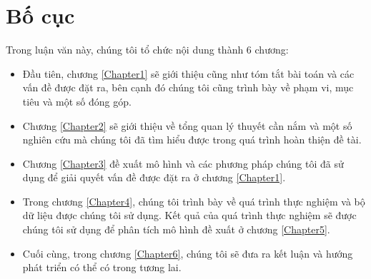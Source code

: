 \section{Bố cục}

Trong luận văn này, chúng tôi tổ chức nội dung thành 6 chương:

\begin{itemize}
\item Đầu tiên, chương \ref{Chapter1} sẽ giới
thiệu cũng như tóm tắt bài toán và các vấn đề được đặt ra, bên cạnh đó chúng tôi cũng trình bày về phạm vi, mục tiêu và một số đóng góp. 

\item Chương \ref{Chapter2} sẽ giới thiệu về tổng quan lý thuyết cần nắm và một số nghiên cứu mà chúng tôi đã tìm hiểu được trong quá trình hoàn thiện đề tài.

\item Chương \ref{Chapter3} đề xuất mô hình và các phương pháp chúng tôi đã sử dụng để giải quyết vấn đề được đặt ra ở chương \ref{Chapter1}.

\item Trong chương \ref{Chapter4}, chúng tôi trình bày về quá trình thực nghiệm và bộ dữ liệu được chúng tôi sử dụng. Kết quả của quá trình thực nghiệm sẽ được chúng tôi sử dụng để phân tích mô hình đề xuất ở chương \ref{Chapter5}.

\item Cuối cùng, trong chương \ref{Chapter6}, chúng tôi sẽ đưa ra kết luận và hướng phát triển có thể có trong tương lai.

\end{itemize}